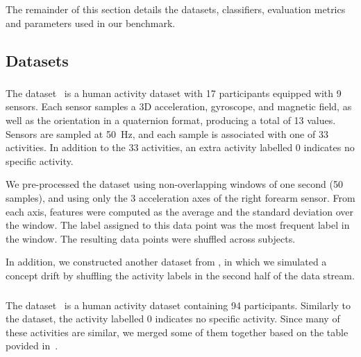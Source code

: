 
The remainder of this section details the datasets, classifiers,
evaluation metrics and parameters used in our benchmark.

\subsection{Datasets}
\subsubsection{\banosdataset}
The \banosdataset dataset~\cite{Banos_2014} is a human
activity dataset with 17 participants
equipped with 9 sensors. Each sensor samples a 3D
acceleration, gyroscope, and magnetic field, as well as 
the orientation in a quaternion format, producing a total of 13 values.
Sensors are
sampled at 50~Hz, and each sample is associated
with one of 33 activities. In
addition to the 33 activities, an extra activity
labelled 0 indicates no specific activity.

We pre-processed the \banosdataset dataset using
non-overlapping windows of one second (50
samples), and using only the 3 acceleration axes of the
right forearm sensor. From each axis, features were computed as the
average and the standard deviation over the window. The label assigned to this data
point was the most frequent label in the window.
The resulting data points were shuffled
across subjects. 

In addition, we constructed another dataset from \banosdataset, in which we
simulated a concept drift by shuffling the activity labels in the
second half of the data stream. 

\subsubsection{\recofitdataset}
The \recofitdataset dataset~\cite{recofit} is a
human activity dataset containing 94
participants. Similarly to the \banosdataset
dataset, the activity labelled 0 indicates no
specific activity.
Since many of these activities are similar, we
merged some of them together based on the table
povided in~\cite{behzad2019}. 


